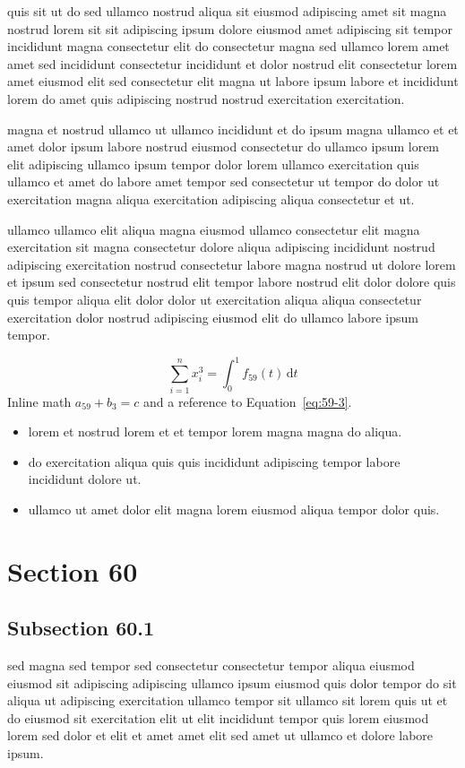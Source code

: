 \documentclass{article}
\begin{document}
quis sit ut do sed ullamco nostrud aliqua sit eiusmod adipiscing amet sit magna nostrud lorem sit sit adipiscing ipsum dolore eiusmod amet adipiscing sit tempor incididunt magna consectetur elit do consectetur magna sed ullamco lorem amet amet sed incididunt consectetur incididunt et dolor nostrud elit consectetur lorem amet eiusmod elit sed consectetur elit magna ut labore ipsum labore et incididunt lorem do amet quis adipiscing nostrud nostrud exercitation exercitation.

magna et nostrud ullamco ut ullamco incididunt et do ipsum magna ullamco et et amet dolor ipsum labore nostrud eiusmod consectetur do ullamco ipsum lorem elit adipiscing ullamco ipsum tempor dolor lorem ullamco exercitation quis ullamco et amet do labore amet tempor sed consectetur ut tempor do dolor ut exercitation magna aliqua exercitation adipiscing aliqua consectetur et ut.

ullamco ullamco elit aliqua magna eiusmod ullamco consectetur elit magna exercitation sit magna consectetur dolore aliqua adipiscing incididunt nostrud adipiscing exercitation nostrud consectetur labore magna nostrud ut dolore lorem et ipsum sed consectetur nostrud elit tempor labore nostrud elit dolor dolore quis quis tempor aliqua elit dolor dolor ut exercitation aliqua aliqua consectetur exercitation dolor nostrud adipiscing eiusmod elit do ullamco labore ipsum tempor.

\begin{equation}\label{eq:59-3}
  \sum_{i=1}^{n} x_i^{3} = \int_0^1 f_{59}(t)\,\mathrm{d}t
\end{equation}
Inline math $a_{59} + b_{3} = c$ and a reference to Equation~\eqref{eq:59-3}.

\begin{itemize}
  \item lorem et nostrud lorem et et tempor lorem magna magna do aliqua.
  \item do exercitation aliqua quis quis incididunt adipiscing tempor labore incididunt dolore ut.
  \item ullamco ut amet dolor elit magna lorem eiusmod aliqua tempor dolor quis.
\end{itemize}

\section{Section 60}\label{sec:60}
\subsection{Subsection 60.1}\label{sec:60-1}
sed magna sed tempor sed consectetur consectetur tempor aliqua eiusmod eiusmod sit adipiscing adipiscing ullamco ipsum eiusmod quis dolor tempor do sit aliqua ut adipiscing exercitation ullamco tempor sit ullamco sit lorem quis ut et do eiusmod sit exercitation elit ut elit incididunt tempor quis lorem eiusmod lorem sed dolor et elit et amet amet elit sed amet ut ullamco et dolore labore ipsum.
\end{document}

